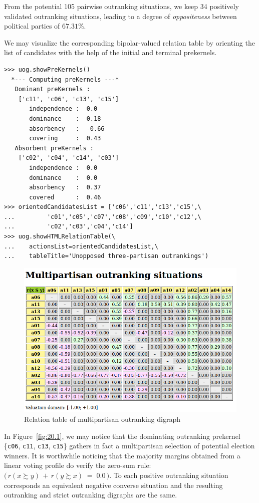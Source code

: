 From the potential 105 pairwise outranking situations, we keep 34 positively validated outranking situations, leading to a degree of \emph{oppositeness} between political parties of $67.31\%$.

We may visualize the corresponding bipolar-valued relation table by orienting the list of candidates with the help of the initial and terminal prekernels.
\begin{lstlisting}[caption={Computing unopposed multiobjective outranking situations},label=list:20.4]
>>> uog.showPreKernels()
  *--- Computing preKernels ---*
   Dominant preKernels :
    ['c11', 'c06', 'c13', 'c15']
       independence :  0.0
       dominance    :  0.18
       absorbency   :  -0.66
       covering     :  0.43
   Absorbent preKernels :
    ['c02', 'c04', 'c14', 'c03']
       independence :  0.0
       dominance    :  0.0
       absorbency   :  0.37
       covered      :  0.46
>>> orientedCandidatesList = ['c06','c11','c13','c15',\
...         'c01','c05','c07','c08','c09','c10','c12',\
...         'c02','c03','c04','c14']
>>> uog.showHTMLRelationTable(\
...    actionsList=orientedCandidatesList,\
...    tableTitle='Unopposed three-partisan outrankings')
\end{lstlisting}
\begin{figure}[ht]
\includegraphics[width=0.9\hsize]{Figures/20-1-unOpposedOutrankings.png}
\caption{Relation table of multipartisan outranking digraph} 
\label{fig:20.1}       %
\end{figure}

In Figure~\vref{fig:20.1}, we may notice that the dominating outranking prekernel \{\texttt{c06}, \texttt{c11}, \texttt{c13}, \texttt{c15}\} gathers in fact a multipartisan selection of potential election winners. It is worthwhile noticing that the majority margins obtained from a linear voting profile do verify the zero-sum rule: $\big(\,r(x \succsim y) \,+\, r(y \succsim x) \;=\; 0.0\,\big)$. To each positive outranking situation corresponds an equivalent negative converse situation and the resulting outranking and strict outranking digraphs are the same.

